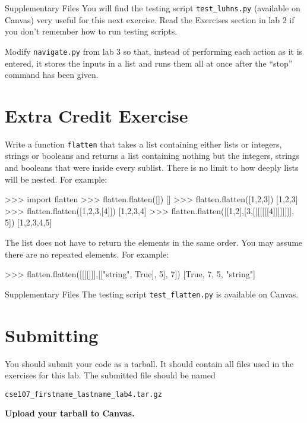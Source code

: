 \documentclass[11pt]{cselabheader}
\begin{document}
\begin{infobox}{Supplementary Files}
You will find the testing script \texttt{test\_luhns.py} (available on Canvas)
very useful for this next exercise. Read the Exercises section in lab 2 if you
don't remember how to run testing scripts.
\end{infobox}

\begin{ex}[navigate2.py] Modify \texttt{navigate.py} from lab 3 so that,
  instead of performing each action as it is entered, it stores the inputs in a
  list and runs them all at once after the ``stop'' command has been given.
\end{ex}

\section{Extra Credit Exercise}

\begin{extraex}[flatten.py]
Write a function \texttt{flatten} that takes a list containing either
lists or integers, strings or booleans and returns a list containing
nothing but the integers, strings and booleans that were inside every
sublist. There is no limit to how deeply lists will be nested.
For example:

\begin{pyconcode}
>>> import flatten
>>> flatten.flatten([])
[]
>>> flatten.flatten([1,2,3])
[1,2,3]
>>> flatten.flatten([1,2,3,[4]])
[1,2,3,4]
>>> flatten.flatten([[1,2],[3,[[[[[[[4]]]]]]]], 5])
[1,2,3,4,5]
\end{pyconcode}

The list does not have to return the elements in the same order.
You may assume there are no repeated elements.
For example:
\begin{pyconcode}
>>> flatten.flatten([[[[]]],[["string", True], 5], 7])
[True, 7, 5, "string"]
\end{pyconcode}
\end{extraex}

\begin{infobox}{Supplementary Files}
The testing script \texttt{test\_flatten.py} is available on Canvas.
\end{infobox}

\pagebreak
\section{Submitting}

You should submit your code as a tarball. It should contain all files
used in the exercises for this lab. The submitted file should be named
\begin{center}
  \texttt{cse107\_firstname\_lastname\_lab4.tar.gz}
\end{center}

\begin{center}
  \textbf{Upload your tarball to Canvas.}
\end{center}

\listexercises
\listextraexercises
\end{document}
